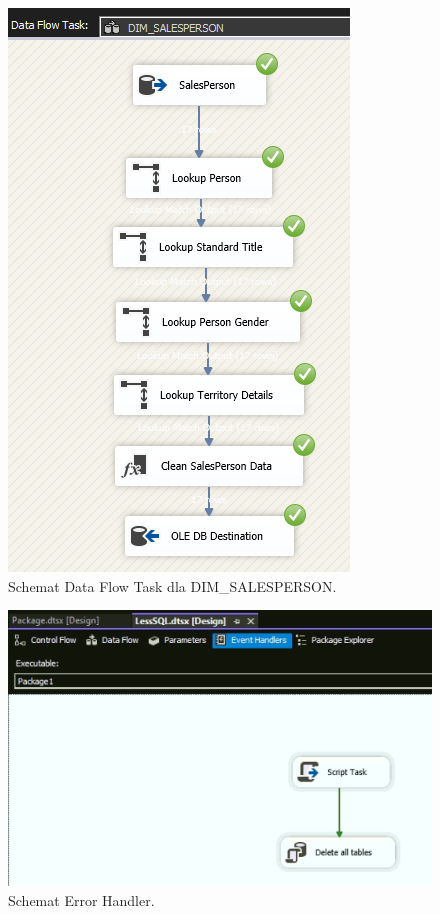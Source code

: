 \documentclass[a4paper,12pt]{article}
\begin{document}
\begin{figure}[H]
    \centering
    \includegraphics[width=\textwidth]{images/5_salesperson.png}
    \caption{Schemat Data Flow Task dla DIM\_SALESPERSON.}
\end{figure}

\begin{figure}[H]
    \centering
    \includegraphics[width=\textwidth]{images/5_error_handlers.png}
    \caption{Schemat Error Handler.}
\end{figure}
\end{document}
